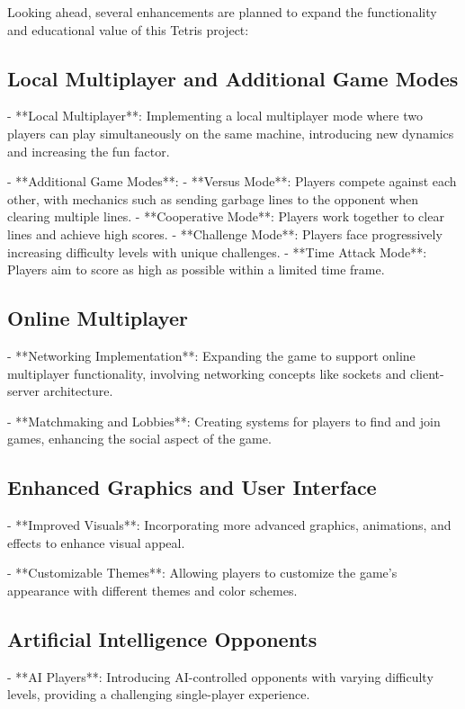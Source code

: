 \documentclass{article}
\begin{document}
Looking ahead, several enhancements are planned to expand the functionality and educational value of this Tetris project:

\subsection{Local Multiplayer and Additional Game Modes}

- **Local Multiplayer**: Implementing a local multiplayer mode where two players can play simultaneously on the same machine, introducing new dynamics and increasing the fun factor.

- **Additional Game Modes**:
  - **Versus Mode**: Players compete against each other, with mechanics such as sending garbage lines to the opponent when clearing multiple lines.
  - **Cooperative Mode**: Players work together to clear lines and achieve high scores.
  - **Challenge Mode**: Players face progressively increasing difficulty levels with unique challenges.
  - **Time Attack Mode**: Players aim to score as high as possible within a limited time frame.

\subsection{Online Multiplayer}

- **Networking Implementation**: Expanding the game to support online multiplayer functionality, involving networking concepts like sockets and client-server architecture.

- **Matchmaking and Lobbies**: Creating systems for players to find and join games, enhancing the social aspect of the game.

\subsection{Enhanced Graphics and User Interface}

- **Improved Visuals**: Incorporating more advanced graphics, animations, and effects to enhance visual appeal.

- **Customizable Themes**: Allowing players to customize the game's appearance with different themes and color schemes.

\subsection{Artificial Intelligence Opponents}

- **AI Players**: Introducing AI-controlled opponents with varying difficulty levels, providing a challenging single-player experience.
\end{document}
